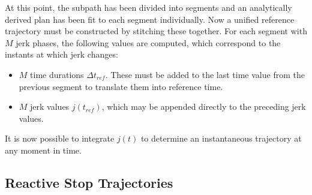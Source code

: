 \documentclass[letterpaper, 10 pt, conference]{ieeeconf}  %
\begin{document}
At this point, the subpath has been divided into segments and an analytically derived plan has been fit to each segment individually.
Now a unified reference trajectory must be constructed by stitching these together.
For each segment with $M$ jerk phases, the following values are computed, which correspond to the instants at which jerk changes:
\begin{itemize}
  \item $M$ time durations $\Delta t_{ref}$. These must be added to the last time value from the previous segment to translate them into reference time.
  \item $M$ jerk values $j(t_{ref})$, which may be appended directly to the preceding jerk values.
\end{itemize}
It is now possible to integrate $j(t)$ to determine an instantaneous trajectory at any moment in time.




\subsection{Reactive Stop Trajectories} \label{sec:reactivestoptrajectory}
\end{document}
